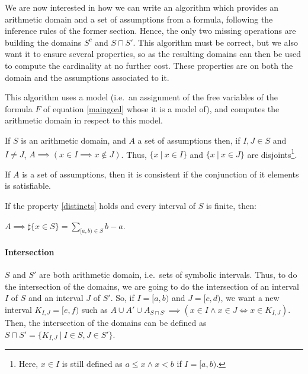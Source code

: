 \documentclass[]{article}
\begin{document}
We are now interested in how we can write an algorithm which provides an
arithmetic domain and a set of assumptions from a formula, following the
inference rules of the former section. Hence, the only two missing
operations are building the domains $S^c$ and $S \sqcap S'$. This
algorithm must be correct, but we also want it to ensure several
properties, so as the resulting domains can then be used to compute the
cardinality at no further cost. These properties are on both the domain
and the assumptions associated to it.

This algorithm uses a model (i.e.~an assignment of the free variables of
the formula $F$ of equation \ref{maingoal} whose it is a model of),
and computes the arithmetic domain in respect to this model.

\vspace{3mm}

\begin{property}[Distincts]

If $S$ is an arithmetic domain, and $A$ a set of assumptions then,
if $I, J \in S$ and $I \neq J$,
$A \implies (x \in I \implies x \not\in J)$. Thus,
$\{x\ |\ x \in I\}$ and $\{x\ |\ x \in J\}$ are
disjoints\footnote{Here, $x \in I$ is still defined as $a \le x \land x < b$ if $I = [a, b)$.}.

\label{distincts}

\end{property}

\vspace{3mm}

\begin{property}[Consistency]

If $A$ is a set of assumptions, then it is consistent if the
conjunction of it elements is satisfiable.

\label{consistency}

\end{property}

If the property \ref{distincts} holds and every interval of $S$ is
finite, then:

$A \implies \sharp\{ x \in S \} = \sum\limits_{[a, b) \in S} b - a$.

\paragraph{Intersection}\label{intersection}

$S$ and $S'$ are both arithmetic domain, i.e.~sets of symbolic
intervals. Thus, to do the intersection of the domains, we are going to
do the intersection of an interval $I$ of $S$ and an interval $J$
of $S'$. So, if $I = [a, b)$ and $J = [c, d)$, we want a new
interval $K_{I, J} = [e, f)$ such as
$A \cup A' \cup A_{S \sqcap S'} \implies \left(x \in I \land x \in J \iff x \in K_{I, J}\right)$.
Then, the intersection of the domains can be defined as
$S \sqcap S' = \{ K_{I, J} \ |\ I \in S, J \in S'\}$.
\end{document}
